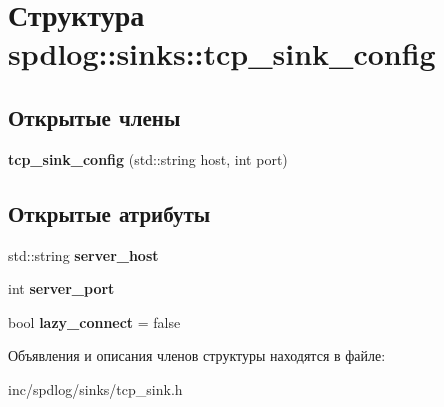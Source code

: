 \hypertarget{structspdlog_1_1sinks_1_1tcp__sink__config}{}\section{Структура spdlog\+:\+:sinks\+:\+:tcp\+\_\+sink\+\_\+config}
\label{structspdlog_1_1sinks_1_1tcp__sink__config}
\subsection*{Открытые члены}
\begin{DoxyCompactItemize}
\item 
\mbox{\label{structspdlog_1_1sinks_1_1tcp__sink__config_af239ad764e4e747c26f3b33ad5557e9e}} 
{\bfseries tcp\+\_\+sink\+\_\+config} (std\+::string host, int port)
\end{DoxyCompactItemize}
\subsection*{Открытые атрибуты}
\begin{DoxyCompactItemize}
\item 
\mbox{\label{structspdlog_1_1sinks_1_1tcp__sink__config_a7fc1a97efaf76b605be25040b3d7047b}} 
std\+::string {\bfseries server\+\_\+host}
\item 
\mbox{\label{structspdlog_1_1sinks_1_1tcp__sink__config_a4f51da2c3cef7535245dfa2fe31f2c2b}} 
int {\bfseries server\+\_\+port}
\item 
\mbox{\label{structspdlog_1_1sinks_1_1tcp__sink__config_a425b74518f031cd718a4690c73a6a5be}} 
bool {\bfseries lazy\+\_\+connect} = false
\end{DoxyCompactItemize}


Объявления и описания членов структуры находятся в файле\+:\begin{DoxyCompactItemize}
\item 
inc/spdlog/sinks/tcp\+\_\+sink.\+h\end{DoxyCompactItemize}
